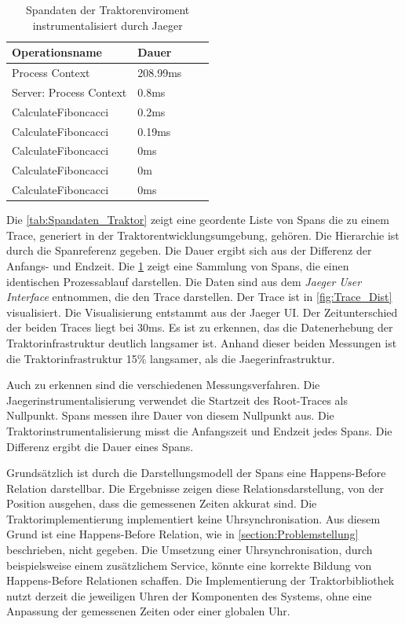 \begin{table}[]
	\centering
	\begin{tabular}{|l|l|l|l|}
		\hline
		Operationsname          & Dauer 	\\ \hline
		Process Context         & 208.99ms  \\ \hline
		Server: Process Context & 0.8ms 	\\ \hline
		CalculateFiboncacci     & 0.2ms 	\\ \hline
		CalculateFiboncacci     & 0.19ms 	\\ \hline
		CalculateFiboncacci     & 0ms		\\ \hline
		CalculateFiboncacci     & 0m		\\ \hline
		CalculateFiboncacci     & 0ms		\\ \hline
	\end{tabular}
	\caption{Spandaten der Traktorenviroment instrumentalisiert durch Jaeger}
	\label{tab:Spandaten_Jaeger}
\end{table}
Die \cref{tab:Spandaten_Traktor} zeigt eine geordente Liste von Spans die zu einem Trace, generiert in der Traktorentwicklungsumgebung, gehören. Die Hierarchie ist durch die Spanreferenz gegeben. Die Dauer ergibt sich aus der Differenz der Anfangs- und Endzeit. Die \cref{tab:Spandaten_Jaeger} zeigt eine Sammlung von Spans, die einen identischen Prozessablauf darstellen. Die Daten sind aus dem \emph{Jaeger User Interface} entnommen, die den Trace darstellen. Der Trace ist in \cref{fig:Trace_Dist} visualisiert. Die Visualisierung entstammt aus der Jaeger UI.
Der Zeitunterschied der beiden Traces liegt bei 30ms. Es ist zu erkennen, das die Datenerhebung der Traktorinfrastruktur deutlich langsamer ist. Anhand dieser beiden Messungen ist die Traktorinfrastruktur 15\% langsamer, als die Jaegerinfrastruktur.

Auch zu erkennen sind die verschiedenen Messungsverfahren. Die Jaegerinstrumentalisierung verwendet die Startzeit des Root-Traces als Nullpunkt. Spans messen ihre Dauer von diesem Nullpunkt aus. Die Traktorinstrumentalisierung misst die Anfangszeit und Endzeit jedes Spans. Die Differenz ergibt die Dauer eines Spans.

Grundsätzlich ist durch die Darstellungsmodell der Spans eine Happens-Before Relation darstellbar. Die Ergebnisse zeigen diese Relationsdarstellung, von der Position ausgehen, dass die gemessenen Zeiten akkurat sind.  Die Traktorimplementierung implementiert keine Uhrsynchronisation. Aus diesem Grund ist eine Happens-Before Relation, wie in \cref{section:Problemstellung} beschrieben, nicht gegeben. Die Umsetzung einer Uhrsynchronisation, durch beispielsweise einem zusätzlichem Service, könnte eine korrekte Bildung von Happens-Before Relationen schaffen. Die Implementierung der Traktorbibliothek nutzt derzeit die jeweiligen Uhren der Komponenten des Systems, ohne eine Anpassung der gemessenen Zeiten oder einer globalen Uhr.

